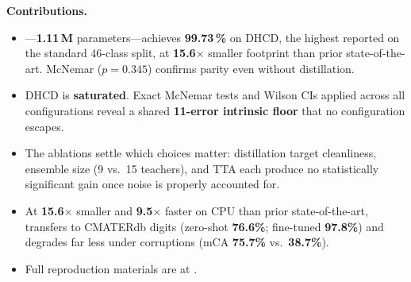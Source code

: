 \medskip
\noindent\textbf{Contributions.}
\begin{itemize}
  \item[\textbf{C1.}] \modelname{}---\textbf{1.11\,M} parameters---achieves
    \textbf{99.73\,\%} on DHCD, the highest reported on the standard 46-class
    split, at \textbf{15.6\(\times\)} smaller footprint than prior
    state-of-the-art. McNemar ($p=0.345$) confirms parity even without
    distillation.

  \item[\textbf{C2.}] DHCD is \textbf{saturated}. Exact McNemar tests and
    Wilson CIs applied across all configurations reveal a shared
    \textbf{11-error intrinsic floor} that no configuration escapes.

  \item[\textbf{C3.}] The ablations settle which choices matter: distillation
    target cleanliness, ensemble size (9 vs.\ 15 teachers), and TTA each
    produce no statistically significant gain once noise is properly accounted
    for.

  \item[\textbf{C4.}] At \textbf{15.6\(\times\)} smaller and \textbf{9.5\(\times\)}
    faster on CPU than prior state-of-the-art, \modelname{} transfers to
    CMATERdb digits (zero-shot \textbf{76.6\%}; fine-tuned \textbf{97.8\%})
    and degrades far less under corruptions (mCA \textbf{75.7\%}
    vs.\ \textbf{38.7\%}).

  \item[\textbf{C5.}] Full reproduction materials are at \repourl{}.
\end{itemize}
